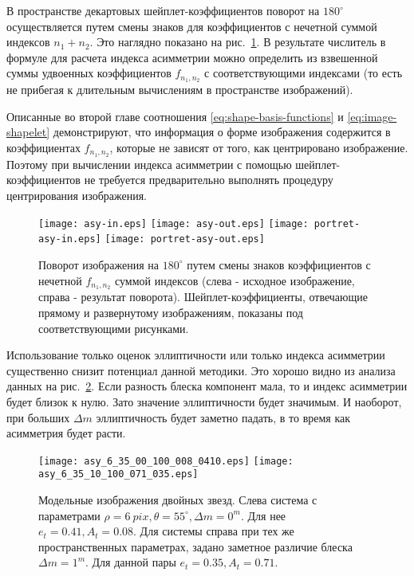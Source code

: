 В пространстве декартовых шейплет-коэффициентов поворот на $180^\circ$ осуществляется путем смены знаков для коэффициентов с нечетной суммой индексов $n_1+n_2$. Это наглядно показано на рис.~\ref{fig:rotate180}. В результате числитель в формуле для расчета индекса асимметрии можно определить из взвешенной суммы удвоенных коэффициентов $f_{n_1,n_2}$ с соответствующими индексами (то есть не прибегая к длительным вычислениям в пространстве изображений). 

Описанные во второй главе соотношения \ref{eq:shape-basis-functions} и \ref{eq:image-shapelet} демонстрируют, что информация о форме изображения содержится в коэффициентах $f_{n_1,n_2}$, которые не зависят от того, как центрировано изображение. Поэтому при вычислении индекса асимметрии с помощью шейплет-коэффициентов не требуется предварительно выполнять процедуру центрирования изображения. 

\begin{figure}
\centering
\texttt{[image: asy-in.eps]}
\texttt{[image: asy-out.eps]}
\texttt{[image: portret-asy-in.eps]}
\texttt{[image: portret-asy-out.eps]}
\caption{Поворот изображения на $180^\circ$ путем смены знаков коэффициентов с нечетной $f_{n_1,n_2}$ суммой индексов (слева - исходное изображение, справа - результат поворота). Шейплет-коэффициенты, отвечающие прямому и развернутому изображениям, показаны под соответствующими рисунками.}
\label{fig:rotate180}
\end{figure}

Использование только оценок эллиптичности или только индекса асимметрии существенно снизит потенциал данной методики. Это хорошо видно из анализа данных на рис.~\ref{fig:bin-examples}. Если разность блеска компонент мала, то и индекс асимметрии будет близок к нулю. Зато значение эллиптичности будет значимым. И наоборот, при больших $\Delta m$ эллиптичность будет заметно падать, в то время как асимметрия будет расти.

\begin{figure}
\centering
\texttt{[image: asy\_6\_35\_00\_100\_008\_0410.eps]}
\texttt{[image: asy\_6\_35\_10\_100\_071\_035.eps]}
\caption{Модельные изображения двойных звезд. Слева система с параметрами $\rho=6~pix,\theta = 55^\circ, \Delta m=0^m $. Для нее $e_t = 0.41, A_t = 0.08$. Для системы справа при тех же пространственных параметрах, задано заметное различие блеска $\Delta m=1^m $. Для данной пары $e_t = 0.35, A_t = 0.71$.}
\label{fig:bin-examples}
\end{figure}

